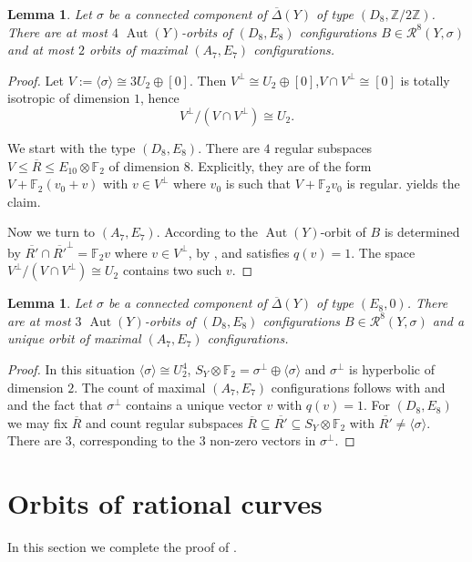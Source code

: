 \documentclass[a4paper]{amsart}
\theoremstyle{definition}
\theoremstyle{plain}
\newtheorem{lemma}[definition]{Lemma}
\DeclareMathOperator{\Aut}{Aut}
\newcommand{\FF}{\mathbb{F}}
\newcommand{\ZZ}{\mathbb{Z}}
\newcommand{\R}{\mathcal{R}}
\newcommand{\DeltabarY}{\overline{\Delta}(Y)}
\begin{document}
\begin{lemma}\label{lem:D8E8_max_configurations}
Let $\sigma$ be a connected component of $\DeltabarY$ of type $(D_8, \ZZ/2\ZZ)$.
There are at most $4$ $\Aut(Y)$-orbits of $(D_8,E_8)$ configurations $B\in \R^8(Y,\sigma)$
and at most $2$ orbits of maximal $(A_7,E_7)$ configurations. 
\end{lemma}
\begin{proof}
Let $V:=\langle \sigma \rangle\cong 3U_2\oplus [0]$. Then $V^\perp \cong U_2 \oplus [0]$,$V\cap V^\perp\cong [0]$ is totally isotropic of dimension $1$, hence 
\[V^\perp/\left(V\cap V^\perp\right)\cong U_2.\]

We start with the type $(D_8,E_8)$. There are $4$ regular subspaces $V \leq \overline{R} \leq E_{10} \otimes \FF_2$ of dimension $8$. Explicitly, they are of the form 
$V+\FF_2(v_0+v)$ with $v \in V^\perp$ where $v_0$ is such that $V+\FF_2 v_0$ is regular.  yields the claim. 

Now we turn to $(A_7,E_7)$. According to  the $\Aut(Y)$-orbit of $B$ is determined by 
$\overline{R'}\cap \overline{R'}^\perp = \FF_2 v$ where $v \in V^\perp$, by , and satisfies $q(v)=1$. 
The space $V^\perp/(V\cap V^\perp)\cong U_2$ contains two such $v$.
\end{proof}

\begin{lemma}\label{lem:E8E8_max_configurations}
Let $\sigma$ be a connected component of $\DeltabarY$ of type $(E_8, 0)$.
There are at most $3$ $\Aut(Y)$-orbits of $(D_8,E_8)$ configurations $B\in \R^8(Y,\sigma)$
and a unique orbit of maximal $(A_7,E_7)$ configurations. 
\end{lemma}
\begin{proof}
In this situation $\langle \sigma \rangle \cong U_2^4$, $S_Y \otimes \FF_2 = \sigma^\perp \oplus \langle \sigma \rangle$ and $\sigma^\perp$ is hyperbolic of dimension $2$. 
The count of maximal $(A_7,E_7)$ configurations follows with  and  and the fact that $\sigma^\perp$ contains a unique vector $v$ with $q(v)=1$.
For $(D_8,E_8)$ we may fix $\overline{R}$ and count regular subspaces $\overline{R} \subseteq \overline{R'} \subseteq S_Y\otimes \FF_2$ with $\overline{R'}\neq \langle \sigma \rangle$.
There are $3$, corresponding to the $3$ non-zero vectors in $\sigma^\perp$.
\end{proof}

\section{Orbits of rational curves}\label{sec:orbits-of-rational-curves}
In this section we complete the proof of .
\end{document}
